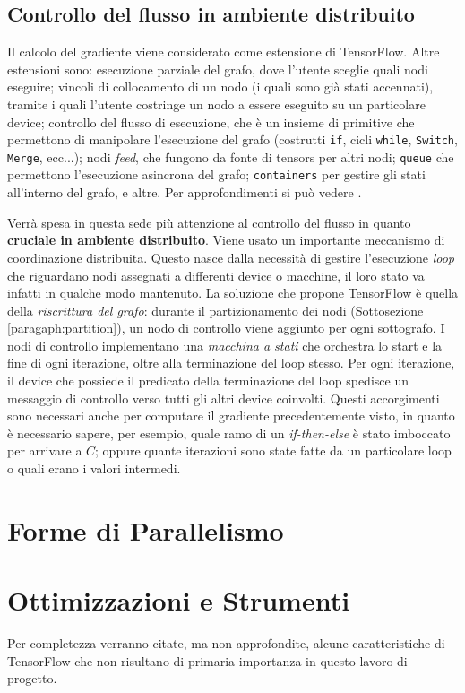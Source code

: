 \documentclass[DIV=calc, paper=a4, fontsize=11pt]{scrartcl}	 %
\begin{document}
\begin{multicols}{2}
				\subsection{Controllo del flusso in ambiente distribuito}
				Il calcolo del gradiente viene considerato come estensione di TensorFlow. Altre estensioni sono: esecuzione parziale del grafo, dove l'utente sceglie quali nodi eseguire; vincoli di collocamento di un nodo (i quali sono già stati accennati), tramite i quali l'utente costringe un nodo a essere eseguito su un particolare device; controllo del flusso di esecuzione, che è un insieme di primitive che permettono di manipolare l'esecuzione del grafo (costrutti \texttt{if}, cicli \texttt{while}, \texttt{Switch}, \texttt{Merge}, ecc...); nodi \textit{feed}, che fungono da fonte di tensors per altri nodi; \texttt{queue} che permettono l'esecuzione asincrona del grafo; \texttt{containers} per gestire gli stati all'interno del grafo, e altre. Per approfondimenti si può vedere \cite{tf}.
				
				Verrà spesa in questa sede più attenzione al controllo del flusso in quanto \textbf{cruciale in ambiente distribuito}. Viene usato un importante meccanismo di coordinazione distribuita. Questo nasce dalla necessità di gestire l'esecuzione \textit{loop} che riguardano nodi assegnati a differenti device o macchine, il loro stato va infatti in qualche modo mantenuto. La soluzione che propone TensorFlow è quella della \textit{riscrittura del grafo}: durante il partizionamento dei nodi (Sottosezione \ref{paragaph:partition}), un nodo di controllo viene aggiunto per ogni sottografo. I nodi di controllo implementano una \textit{macchina a stati} che orchestra lo start e la fine di ogni iterazione, oltre alla terminazione del loop stesso. Per ogni iterazione, il device che possiede il predicato della terminazione del loop spedisce un messaggio di controllo verso tutti gli altri device coinvolti. Questi accorgimenti sono necessari anche per computare il gradiente precedentemente visto, in quanto è necessario sapere, per esempio, quale ramo di un \textit{if-then-else}	è stato imboccato per arrivare a $C$; oppure quante iterazioni sono state fatte da un particolare loop o quali erano i valori intermedi.
		
		\section{Forme di Parallelismo}
		
		\section{Ottimizzazioni e Strumenti}
		Per completezza verranno citate, ma non approfondite, alcune caratteristiche di TensorFlow che non risultano di primaria importanza in questo lavoro di progetto.
		

\end{multicols}
\end{document}
